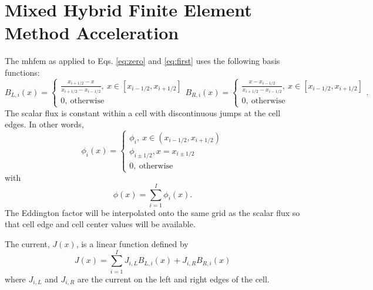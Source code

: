 
\newcommand{\bl}{B_{L,i}(x)}
\newcommand{\br}{B_{R,i}(x)}
\newcommand{\jil}{J_{i,L}}
\newcommand{\jir}{J_{i,R}}
\newcommand{\eddphi}[1]{\edd_{#1}\phi_{#1}}
\newcommand{\alphai}[2]{\frac{#1}{\Sigma_{t,#2}h_{#2}}}

\section{Mixed Hybrid Finite Element Method Acceleration}

The \gls{mhfem} as applied to Eqs. \ref{eq:zero} and \ref{eq:first} uses the following basis functions:
	\begin{subequations}
	\begin{equation} \label{mhfem:BL}
		\bl = \begin{cases}
			\frac{x_{i+1/2} - x}{x_{i+1/2} - x_{i-1/2}}, \ x \in [x_{i-1/2}, x_{i+1/2}] \\ 
			0, \ \text{otherwise}
		\end{cases}
	\end{equation}
	\begin{equation} \label{mhfem:BR}
		\br = \begin{cases}
			\frac{x - x_{i-1/2}}{x_{i+1/2} - x_{i-1/2}}, \ x \in [x_{i-1/2}, x_{i+1/2}] \\ 
			0, \ \text{otherwise}
		\end{cases}. 
	\end{equation}
	\end{subequations}
The scalar flux is constant within a cell with discontinuous jumps at the cell edges. In other words, 
	\begin{equation} \label{mhfem:flux}
		\phi_i(x) = \begin{cases}
			\phi_i, \ x \in (x_{i-1/2}, x_{i+1/2}) \\ 
			\phi_{i\pm 1/2}, x = x_{i\pm1/2} \\ 
			0, \ \text{otherwise}
		\end{cases} 
	\end{equation}
with 
	\begin{equation} \label{mhfem:sumphi}
		\phi(x) = \sum_{i=1}^I \phi_i(x). 
	\end{equation}
The Eddington factor will be interpolated onto the same grid as the scalar flux so that cell edge and cell center values will be available.  

The current, $J(x)$, is a linear function defined by 
	\begin{equation} \label{mhfem:J}
		J(x) = \sum_{i=1}^I \jil \bl + \jir \br
	\end{equation} 
where $\jil$ and $\jir$ are the current on the left and right edges of the cell. 

